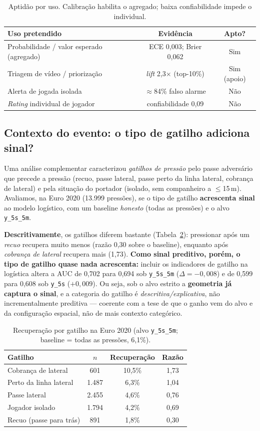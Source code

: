 \documentclass[a4paper,11pt]{article}
\begin{document}
\begin{table}[ht]
\centering
\caption{Aptidão por uso. Calibração habilita o agregado; baixa confiabilidade impede o individual.}
\label{tab:scope}
\begin{tabular}{lcc}
\toprule
Uso pretendido & Evidência & Apto? \\
\midrule
Probabilidade / valor esperado (agregado) & ECE 0,003; Brier 0,062 & Sim \\
Triagem de vídeo / priorização & \emph{lift} 2,3$\times$ (top-10\%) & Sim (apoio) \\
Alerta de jogada isolada & $\approx$84\% falso alarme & Não \\
\emph{Rating} individual de jogador & confiabilidade 0,09 & Não \\
\bottomrule
\end{tabular}
\end{table}

\subsection{Contexto do evento: o tipo de gatilho adiciona sinal?}
Uma análise complementar caracterizou \emph{gatilhos de pressão} pelo passe adversário que precede a pressão (recuo, passe lateral, passe perto da linha lateral, cobrança de lateral) e pela situação do portador (isolado, sem companheiro a $\le$15\,m). Avaliamos, na Euro 2020 (13.999 pressões), se o tipo de gatilho \textbf{acrescenta sinal} ao modelo logístico, com um baseline \emph{honesto} (todas as pressões) e o alvo \texttt{y\_5s\_5m}.

\textbf{Descritivamente}, os gatilhos diferem bastante (Tabela~\ref{tab:trig}): pressionar após um \emph{recuo} recupera muito menos (razão 0,30 sobre o baseline), enquanto após \emph{cobrança de lateral} recupera mais (1,73). \textbf{Como sinal preditivo, porém, o tipo de gatilho quase nada acrescenta:} incluir os indicadores de gatilho na logística altera a AUC de 0,702 para 0,694 sob \texttt{y\_5s\_5m} ($\Delta=-0{,}008$) e de 0,599 para 0,608 sob \texttt{y\_5s} ($+0{,}009$). Ou seja, sob o alvo estrito a \textbf{geometria já captura o sinal}, e a categoria do gatilho é \emph{descritiva/explicativa}, não incrementalmente preditiva --- coerente com a tese de que o ganho vem do alvo e da configuração espacial, não de mais contexto categórico.

\begin{table}[ht]
\centering
\caption{Recuperação por gatilho na Euro 2020 (alvo \texttt{y\_5s\_5m}; baseline = todas as pressões, 6,1\%).}
\label{tab:trig}
\begin{tabular}{lccc}
\toprule
Gatilho & $n$ & Recuperação & Razão \\
\midrule
Cobrança de lateral & 601 & 10,5\% & 1,73 \\
Perto da linha lateral & 1.487 & 6,3\% & 1,04 \\
Passe lateral & 2.455 & 4,6\% & 0,76 \\
Jogador isolado & 1.794 & 4,2\% & 0,69 \\
Recuo (passe para trás) & 891 & 1,8\% & 0,30 \\
\bottomrule
\end{tabular}
\end{table}
\end{document}
